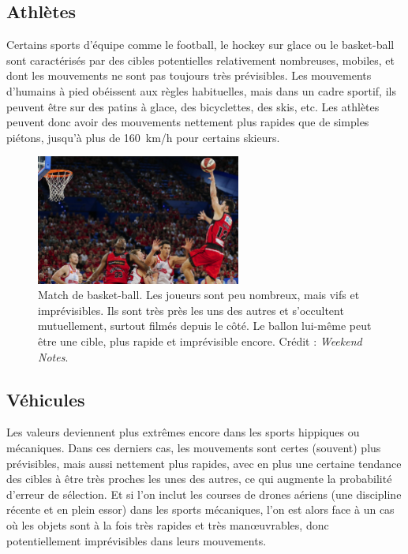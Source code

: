 	\FloatBarrier \subsection{Athlètes}
	
	Certains sports d'équipe comme le football, le hockey sur glace ou le basket-ball sont caractérisés par des cibles potentielles relativement nombreuses, mobiles, et dont les mouvements ne sont pas toujours très prévisibles. Les mouvements d'humains à pied obéissent aux règles habituelles, mais dans un cadre sportif, ils peuvent être sur des patins à glace, des bicyclettes, des skis, etc. Les athlètes peuvent donc avoir des mouvements nettement plus rapides que de simples piétons, jusqu'à plus de 160~km/h pour certains skieurs\footnotemark.
	
	
	\begin{figure}[!htbp]
		\centering
		\includegraphics[width=0.60\textwidth]{figures/ch1/basket}
		\caption[Match de basket-ball]{Match de basket-ball. Les joueurs sont peu nombreux, mais vifs et imprévisibles. Ils sont très près les uns des autres et s'occultent mutuellement, surtout filmés depuis le côté. Le ballon lui-même peut être une cible, plus rapide et imprévisible encore. Crédit : \emph{Weekend Notes}\footnotemark.}
		\label{fig:basketball}
	\end{figure}
	
	
	\FloatBarrier \subsection{Véhicules}
	Les valeurs deviennent plus extrêmes encore dans les sports hippiques ou mécaniques. Dans ces derniers cas, les mouvements sont certes (souvent) plus prévisibles, mais aussi nettement plus rapides, avec en plus une certaine tendance des cibles à être très proches les unes des autres, ce qui augmente la probabilité d'erreur de sélection. Et si l'on inclut les courses de drones aériens\footnotemark{} (une discipline récente et en plein essor) dans les sports mécaniques, l'on est alors face à un cas où les objets sont à la fois très rapides et très manœuvrables, donc potentiellement imprévisibles dans leurs mouvements.
	
